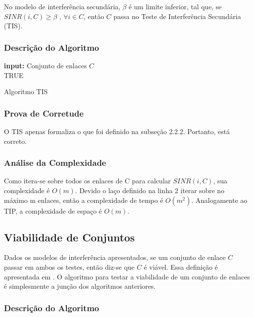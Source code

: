 No modelo de interferência secundária, $\beta$ é um limite inferior, tal que, se $SINR(i,C) \geq \beta$ , $\forall i \in C$, então $C$ passa no Teste de Interferência Secundária (TIS).

\subsubsection{Descrição do Algoritmo}

\begin{algorithm}[h]
	\SetVline
	{\bf input:} Conjunto de enlaces $C$\\
	\Return TRUE
\caption{Algoritmo TIS}
\label{alg:tis}
\end{algorithm}

\subsubsection{Prova de Corretude}

O TIS apenas formaliza o que foi definido na subseção 2.2.2. Portanto, está correto.

\subsubsection{Análise da Complexidade}

Como itera-se sobre todos os enlaces de C para calcular $SINR(i,C)$, sua complexidade é $O(m)$. Devido o laço definido na linha 2 iterar sobre no máximo m enlaces, então a complexidade de tempo é $O(m^2)$. Analogamente ao TIP, a complexidade de espaço é $O(m)$.

\subsection{Viabilidade de Conjuntos}

Dados os modelos de interferência apresentados, se um conjunto de enlace $C$ passar em ambos os testes, então diz-se que $C$ é viável. Essa definição é apresentada em \cite{scheduling}. O algoritmo para testar a viabilidade de um conjunto de enlaces é simplesmente a junção dos algoritmos anteriores.

\subsubsection{Descrição do Algoritmo}

